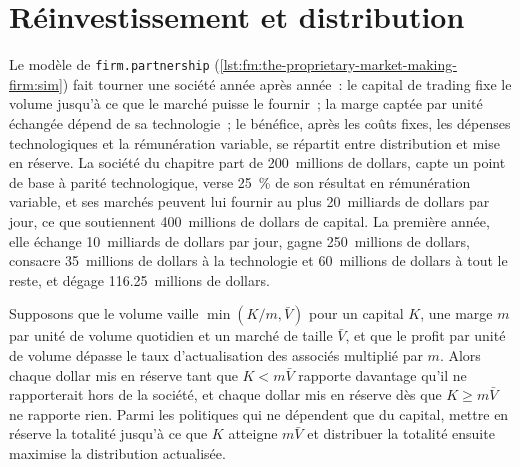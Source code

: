 \label{lst:fm:the-proprietary-market-making-firm:req}

\section{Réinvestissement et distribution}

Le modèle de \texttt{firm.partnership} (\cref{lst:fm:the-proprietary-market-making-firm:sim}) fait tourner une société année après année~: le capital de trading fixe le volume
jusqu'à ce que le marché puisse le fournir~; la marge captée par unité échangée dépend de sa technologie~; le bénéfice, après les coûts fixes, les dépenses technologiques et la
rémunération variable, se répartit entre distribution et mise en réserve. La société du chapitre part de 200~millions de dollars, capte un point de base à parité technologique, verse
25~\% de son résultat en rémunération variable, et ses marchés peuvent lui fournir au plus 20~milliards de dollars par jour, ce que soutiennent 400~millions de dollars de capital. La première année, elle
échange 10~milliards de dollars par jour, gagne 250~millions de dollars, consacre 35~millions de dollars à la technologie et 60~millions de dollars à tout le reste, et dégage 116.25~millions de dollars.

\label{lst:fm:the-proprietary-market-making-firm:sim}

\begin{proposition}\label{prop:fm:the-proprietary-market-making-firm:retain}
Supposons que le volume vaille $\min(K/m,\bar V)$ pour un capital $K$, une marge $m$ par unité de volume quotidien et un marché de taille $\bar V$, et que le profit par unité
de volume dépasse le taux d'actualisation des associés multiplié par $m$. Alors chaque dollar mis en réserve tant que $K<m\bar V$ rapporte davantage qu'il ne rapporterait hors de la société,
et chaque dollar mis en réserve dès que $K\ge m\bar V$ ne rapporte rien. Parmi les politiques qui ne dépendent que du capital, mettre en réserve la totalité jusqu'à ce que $K$ atteigne
$m\bar V$ et distribuer la totalité ensuite maximise la distribution actualisée.
\end{proposition}

